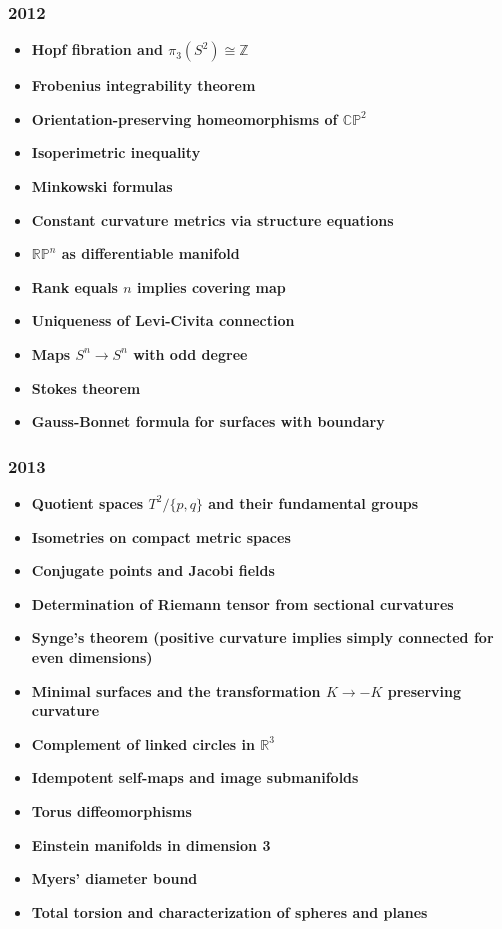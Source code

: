 \subsubsection*{2012}
\begin{itemize}
    \item \textbf{Hopf fibration and $\pi_3(S^2) \cong \mathbb{Z}$}
    \item \textbf{Frobenius integrability theorem}
    \item \textbf{Orientation-preserving homeomorphisms of $\mathbb{CP}^2$}
    \item \textbf{Isoperimetric inequality}
    \item \textbf{Minkowski formulas}
    \item \textbf{Constant curvature metrics via structure equations}
    \item \textbf{$\mathbb{RP}^n$ as differentiable manifold}
    \item \textbf{Rank equals $n$ implies covering map}
    \item \textbf{Uniqueness of Levi-Civita connection}
    \item \textbf{Maps $S^n \to S^n$ with odd degree}
    \item \textbf{Stokes theorem}
    \item \textbf{Gauss-Bonnet formula for surfaces with boundary}
\end{itemize}

\subsubsection*{2013}
\begin{itemize}
    \item \textbf{Quotient spaces $T^2/\{p,q\}$ and their fundamental groups}
    \item \textbf{Isometries on compact metric spaces}
    \item \textbf{Conjugate points and Jacobi fields}
    \item \textbf{Determination of Riemann tensor from sectional curvatures}
    \item \textbf{Synge's theorem (positive curvature implies simply connected for even dimensions)}
    \item \textbf{Minimal surfaces and the transformation $K \to -K$ preserving curvature}
    \item \textbf{Complement of linked circles in $\mathbb{R}^3$}
    \item \textbf{Idempotent self-maps and image submanifolds}
    \item \textbf{Torus diffeomorphisms}
    \item \textbf{Einstein manifolds in dimension 3}
    \item \textbf{Myers' diameter bound}
    \item \textbf{Total torsion and characterization of spheres and planes}
\end{itemize}

